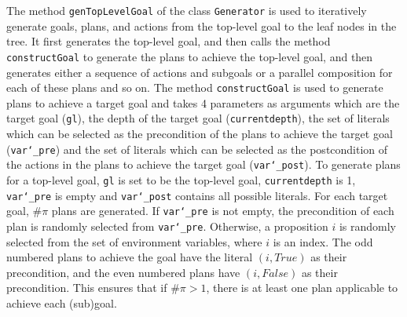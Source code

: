 \documentclass[11pt, a4paper]{article}
\begin{document}
The method \texttt{genTopLevelGoal} of the class \texttt{Generator} is used to iteratively generate goals, plans, and actions from the top-level goal to the leaf nodes in the tree. It first generates the top-level goal, and then calls the method \texttt{constructGoal} to generate the plans to achieve the top-level goal, and then generates either a sequence of actions and subgoals or a parallel composition for each of these plans and so on. 
%
The method \texttt{constructGoal} is used to generate plans to achieve a target goal and takes 4 parameters as arguments which are the target goal (\texttt{gl}), the depth of the target goal (\texttt{currentdepth}), the set of literals which can be selected as the precondition of the plans to achieve the target goal (\texttt{var\char`_pre}) and the set of literals which can be selected as the postcondition of the actions in the plans to achieve the target goal (\texttt{var\char`_post}). 
%
To generate plans for a top-level goal, \texttt{gl} is set to be the top-level goal, \texttt{currentdepth} is 1, \texttt{var\char`_pre} is empty and \texttt{var\char`_post} contains all possible literals. 
%
For each target goal, $\#\pi$ plans are generated. If \texttt{var\char`_pre} is not empty, the precondition of each plan is randomly selected from \texttt{var\char`_pre}. Otherwise, a proposition $i$ is randomly selected from the set of environment variables, where $i$ is an index. The odd numbered plans to achieve the goal have the literal $(i, \mathit{True})$ as their precondition, and the even numbered plans have $(i, \mathit{False})$ as their precondition. This ensures that if $\#\pi > 1$, there is at least one plan applicable to achieve each (sub)goal. 
\end{document}
